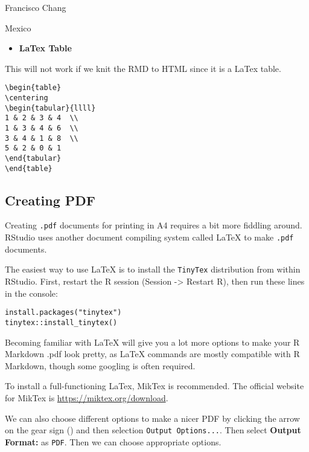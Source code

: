 \documentclass[
]{article}
\providecommand{\tightlist}{%
  \setlength{\itemsep}{0pt}\setlength{\parskip}{0pt}}
\begin{document}
Francisco Chang

Mexico

\begin{itemize}
\tightlist
\item
  \textbf{LaTex Table}
\end{itemize}

This will not work if we knit the RMD to HTML since it is a LaTex table.

\begin{verbatim}
\begin{table}
\centering
\begin{tabular}{llll}
1 & 2 & 3 & 4  \\
1 & 3 & 4 & 6  \\
3 & 4 & 1 & 8  \\
5 & 2 & 0 & 1 
\end{tabular}
\end{table}
\end{verbatim}

\hypertarget{creating-pdf}{%
\subsection{Creating PDF}\label{creating-pdf}}

Creating \texttt{.pdf} documents for printing in A4 requires a bit more
fiddling around. RStudio uses another document compiling system called
LaTeX to make \texttt{.pdf} documents.

The easiest way to use LaTeX is to install the \texttt{TinyTex}
distribution from within RStudio. First, restart the R session (Session
-\textgreater{} Restart R), then run these lines in the console:

\begin{verbatim}
install.packages("tinytex")
tinytex::install_tinytex()
\end{verbatim}

Becoming familiar with LaTeX will give you a lot more options to make
your R Markdown .pdf look pretty, as LaTeX commands are mostly
compatible with R Markdown, though some googling is often required.

To install a full-functioning LaTex, MikTex is recommended. The official
website for MikTex is \url{https://miktex.org/download}.

We can also choose different options to make a nicer PDF by clicking the
arrow on the gear sign () and then selection
\texttt{Output\ Options...}. Then select \textbf{Output Format:} as
\texttt{PDF}. Then we can choose appropriate options.
\end{document}
